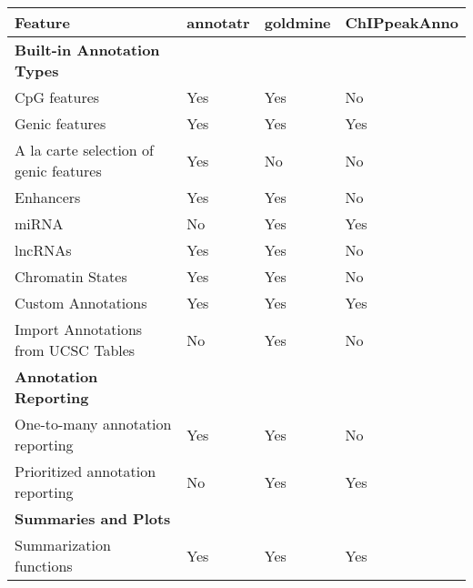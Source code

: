 \newpage

\begin{table}[!ht]
\small
\centering
\begin{tabular}{l|lll}
\textbf{Feature}                           & \textbf{annotatr} & \textbf{goldmine} & \textbf{ChIPpeakAnno} \\\hline
\textbf{Built-in Annotation Types}         &                   &                   &                       \\\hline
CpG features                               & Yes               & Yes               & No                    \\
Genic features                             & Yes               & Yes               & Yes                   \\
A la carte selection of genic features     & Yes               & No                & No                    \\
Enhancers                                  & Yes               & Yes               & No                    \\
miRNA                                      & No                & Yes               & Yes                   \\
lncRNAs                                    & Yes               & Yes               & No                    \\
Chromatin States                           & Yes               & Yes               & No                    \\
Custom Annotations                         & Yes               & Yes               & Yes                   \\
Import Annotations from UCSC Tables        & No                & Yes               & No                    \\\hline
\textbf{Annotation Reporting}              &                   &                   &                       \\\hline
One-to-many annotation reporting           & Yes               & Yes               & No                    \\
Prioritized annotation reporting           & No                & Yes               & Yes                   \\\hline
\textbf{Summaries and Plots}               &                   &                   &                       \\\hline
Summarization functions                    & Yes               & Yes               & Yes                   \\

\end{tabular}
\end{table}
